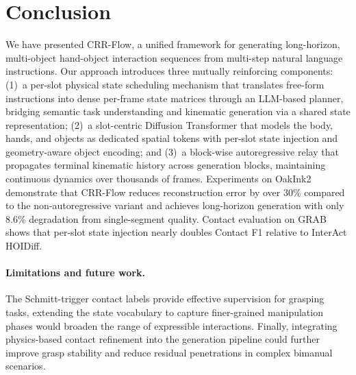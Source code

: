 \documentclass[sigconf, screen, review, anonymous]{acmart}
\begin{document}


\section{Conclusion}
\label{sec:conclusion}

We have presented CRR-Flow, a unified framework for generating long-horizon, multi-object hand-object interaction sequences from multi-step natural language instructions.
Our approach introduces three mutually reinforcing components: (1)~a per-slot physical state scheduling mechanism that translates free-form instructions into dense per-frame state matrices through an LLM-based planner, bridging semantic task understanding and kinematic generation via a shared state representation;
(2)~a slot-centric Diffusion Transformer that models the body, hands, and objects as dedicated spatial tokens with per-slot state injection and geometry-aware object encoding; and (3)~a block-wise autoregressive relay that propagates terminal kinematic history across generation blocks, maintaining continuous dynamics over thousands of frames.
Experiments on OakInk2 demonstrate that CRR-Flow reduces reconstruction error by over 30\% compared to the non-autoregressive variant and achieves long-horizon generation with only 8.6\% degradation from single-segment quality.
Contact evaluation on GRAB shows that per-slot state injection nearly doubles Contact F1 relative to InterAct HOIDiff.


\paragraph{Limitations and future work.}
The Schmitt-trigger contact labels provide effective supervision for grasping tasks, extending the state vocabulary to capture finer-grained manipulation phases would broaden the range of expressible interactions.
Finally, integrating physics-based contact refinement into the generation pipeline could further improve grasp stability and reduce residual penetrations in complex bimanual scenarios.






\end{document}
